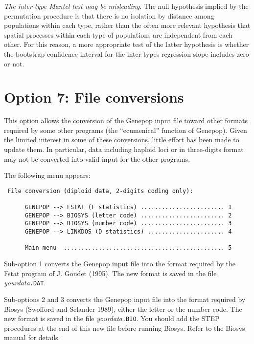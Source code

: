 \documentclass[
  12pt,
]{book}
\begin{document}
\emph{The inter-type Mantel test may be misleading}. The null hypothesis implied by the permutation procedure is that there is no isolation by distance among populations within each type, rather than the often more relevant hypothesis that spatial processes within each type of populations are independent from each other. For this reason, a more appropriate test of the latter hypothesis is whether the bootstrap confidence interval for the inter-types regression slope includes zero or not.

\hypertarget{option-7-file-conversions}{%
\section{Option 7: File conversions}\label{option-7-file-conversions}}

This option allows the conversion of the Genepop input file toward other formats required by some other programs (the ``ecumenical'' function of Genepop). Given the limited interest in some of these conversions, little effort has been made to update them. In particular, data including haploid loci or in three-digits format may not be converted into valid input for the other programs.

The following menu appears:

\begin{verbatim}
 File conversion (diploid data, 2-digits coding only):

      GENEPOP --> FSTAT (F statistics) ........................ 1
      GENEPOP --> BIOSYS (letter code) ........................ 2
      GENEPOP --> BIOSYS (number code) ........................ 3
      GENEPOP --> LINKDOS (D statistics) ...................... 4

      Main menu  .............................................. 5
\end{verbatim}

Sub-option 1 converts the Genepop input file into the format required by the Fstat program of J. Goudet (1995). The new format is saved in the file \emph{yourdata}\texttt{.DAT}.

Sub-options 2 and 3 converts the Genepop input file into the format required by Biosys (Swofford and Selander 1989), either the letter or the number code. The new format is saved in the file \emph{yourdata}\texttt{.BIO}. You should add the STEP procedures at the end of this new file before running Biosys. Refer to the Biosys manual for details.
\end{document}
